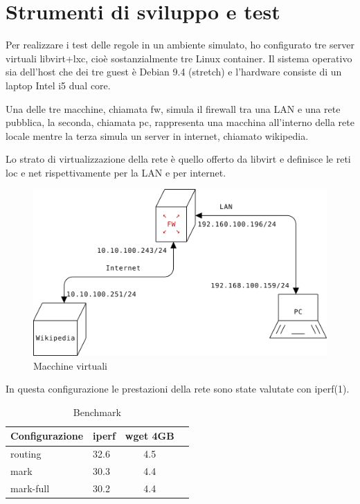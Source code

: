 \chapter{Strumenti di sviluppo e test}

Per realizzare i test delle regole in un ambiente simulato, ho configurato tre
server virtuali libvirt+lxc, cio\`e sostanzialmente tre Linux container.  Il
sistema operativo sia dell'host che dei tre guest \`e Debian 9.4 (stretch) e
l'hardware consiste di un laptop Intel i5 dual core.

Una delle tre macchine, chiamata fw, simula il firewall tra una LAN e una rete
pubblica, la seconda, chiamata pc, rappresenta una macchina all'interno della rete
locale mentre la terza simula un server in internet, chiamato wikipedia.

Lo strato di virtualizzazione della rete \`e quello offerto da libvirt e
definisce le reti loc e net rispettivamente per la LAN e per internet.
\begin{figure}[H]
\begin{center}
      \includegraphics[width=.7\linewidth]{vnet.svg.png}
      \caption{Macchine virtuali}
      \label{fig:vnet}
\end{center}
\end{figure}
In questa configurazione le prestazioni della rete sono state valutate con iperf(1).
\begin{center}
  \label{tab:benchmark}
  \begin{table}[ht]
    \centering %
     \begin{tabular}{@{}llcc@{}}
     \toprule
     {\bf Configurazione} & {\bf iperf} & {\bf wget 4GB} \\ \midrule
         routing  & 32.6                & 4.5 \\
         mark     & 30.3                & 4.4 \\ 
         mark-full& 30.2                & 4.4 \\ \bottomrule
      \end{tabular}  
    \caption{Benchmark} %
  \end{table}
\end{center}

